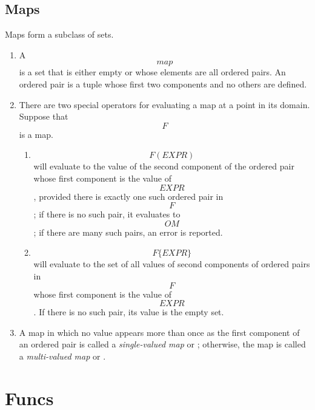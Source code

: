 \subsection{Maps}

Maps form a subclass of sets.

    \begin{enumerate}

    \item {}
    A \[map\] is a set that is either empty
    or whose elements are all ordered pairs.
    An ordered pair is a tuple
    whose first two components and no others are defined.

    \item
    There are two special operators for evaluating a map at a point in its
    domain.
    Suppose that \[F\] is a map.

	\begin{enumerate}

	\item
	\[F(EXPR)\] will evaluate to the value of the second component
	of the ordered pair whose first component
	is the value of \[EXPR\], provided there is exactly
	one such ordered pair in \[F\];
	if there is no such pair, it evaluates to \[OM\];
	if there are many such pairs, an error is reported.

	\item
	\[F\{EXPR\}\] will evaluate to the set of all values
	of second components of ordered pairs in \[F\]
	whose first component is the value of \[EXPR\]\@.
	If there is no such pair, its value is the empty set.
	\end{enumerate}


    \item
    A map in which no value appears more 
    than once as the first component of an
    ordered pair is called a {\em single-valued map\/} or 
    ;
    otherwise, the map is called a {\em multi-valued map\/} or 
    .
    \end{enumerate}


\section{Funcs}\label{funcs}

